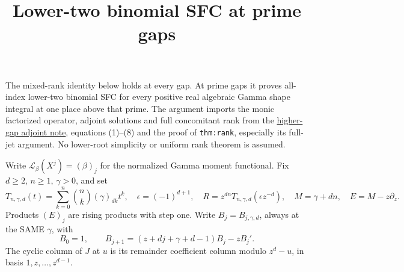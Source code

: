 \documentclass[11pt]{article}
\begin{document}
\setlength{\emergencystretch}{2em}
\title{Lower-two binomial SFC at prime gaps}
\author{}\date{}\maketitle
The mixed-rank identity below holds at every gap. At prime gaps it
proves all-index lower-two binomial SFC for every positive real
algebraic Gamma shape integral at one place above that prime.
The argument imports the monic factorized operator, adjoint
solutions and full concomitant rank from the
\href{HIGHER_GAP_ADJOINT_RANK.tex}{higher-gap adjoint note}, equations (1)--(8) and the proof
of \texttt{thm:rank}, especially its full-jet argument.
No lower-root simplicity or uniform rank theorem is assumed.

Write $\mathcal L_\beta(X^j)=(\beta)_j$ for the normalized
Gamma moment functional. Fix $d\ge2$, $n\ge1$, $\gamma>0$, and set
\[
 T_{n,\gamma,d}(t)=\sum_{k=0}^n\binom nk(\gamma)_{dk}t^k,\quad
 \epsilon=(-1)^{d+1},\quad
 R=z^{dn}T_{n,\gamma,d}(\epsilon z^{-d}),\quad
 M=\gamma+dn,\quad E=M-z\partial_z.
\]
Products $(E)_j$ are rising products with step one.
Write $B_j=B_{j,\gamma,d}$, always at the SAME $\gamma$, with
\[
 B_0=1,\qquad B_{j+1}=(z+dj+\gamma+d-1)B_j-zB_j'.
\]
The cyclic column of $J$ at $u$ is its remainder coefficient
column modulo $z^d-u$, in basis $1,z,\ldots,z^{d-1}$.
\end{document}
